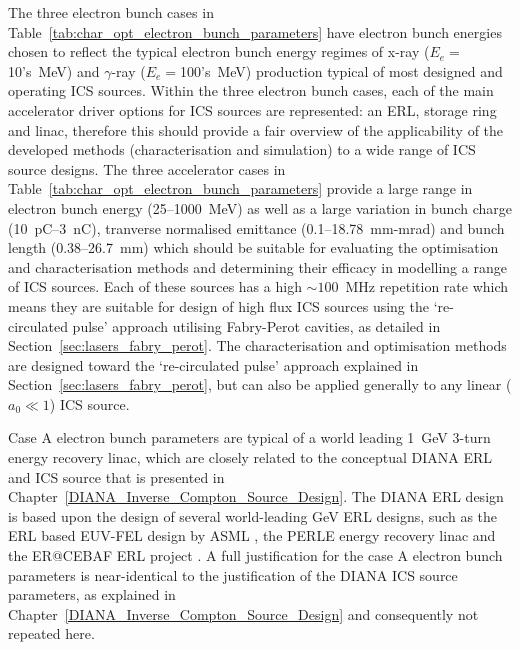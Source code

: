 \documentclass[../main.tex]{subfiles}
\begin{document}
The three electron bunch cases in Table~\ref{tab:char_opt_electron_bunch_parameters} have electron bunch energies chosen to reflect the typical electron bunch energy regimes of x-ray ($E_{e} =$10's~\si{\mega\electronvolt}) and $\gamma$-ray ($E_{e} =$100's~\si{\mega\electronvolt}) production typical of most designed and operating ICS sources. Within the three electron bunch cases, each of the main accelerator driver options for ICS sources are represented: an ERL, storage ring and linac, therefore this should provide a fair overview of the applicability of the developed methods (characterisation and simulation) to a wide range of ICS source designs. The three accelerator cases in Table~\ref{tab:char_opt_electron_bunch_parameters} provide a large range in electron bunch energy (25--1000~\si{\mega\electronvolt}) as well as a large variation in bunch charge (10~\si{\pico\coulomb}--3~\si{\nano\coulomb}), tranverse normalised emittance (0.1--18.78~\si{\milli\meter}-\si{\milli\radian}) and bunch length (0.38--26.7~\si{\milli\meter}) which should be suitable for evaluating the optimisation and characterisation methods and determining their efficacy in modelling a range of ICS sources. Each of these sources has a high $\sim100$~\si{\mega\hertz} repetition rate which means they are suitable for design of high flux ICS sources using the `re-circulated pulse' approach utilising Fabry-Perot cavities, as detailed in Section~\ref{sec:lasers_fabry_perot}. The characterisation and optimisation methods are designed toward the `re-circulated pulse' approach explained in Section~\ref{sec:lasers_fabry_perot}, but can also be applied generally to any linear ($a_{0}\ll 1$) ICS source. 

Case A electron bunch parameters are typical of a world leading 1~\si{\giga\electronvolt} 3-turn energy recovery linac, which are closely related to the conceptual DIANA ERL and ICS source that is presented in Chapter~\ref{DIANA_Inverse_Compton_Source_Design}. The DIANA ERL design is based upon the design of several world-leading \si{\giga\electronvolt} ERL designs, such as the ERL based EUV-FEL design by ASML \cite{akkermans2017compact}, the PERLE energy recovery linac \cite{angal2018perle} and the ER@CEBAF ERL project \cite{meot2016er,bogacz2016er}. A full justification for the case A electron bunch parameters is near-identical to the justification of the DIANA ICS source parameters, as explained in Chapter~\ref{DIANA_Inverse_Compton_Source_Design} and consequently not repeated here.       
\end{document}
